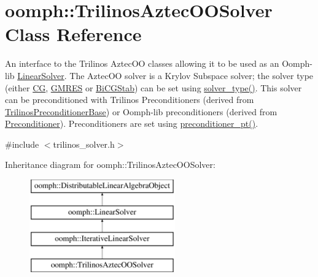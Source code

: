 \hypertarget{classoomph_1_1TrilinosAztecOOSolver}{}\section{oomph\+:\+:Trilinos\+Aztec\+O\+O\+Solver Class Reference}
\label{classoomph_1_1TrilinosAztecOOSolver}


An interface to the Trilinos Aztec\+OO classes allowing it to be used as an Oomph-\/lib \hyperlink{classoomph_1_1LinearSolver}{Linear\+Solver}. The Aztec\+OO solver is a Krylov Subspace solver; the solver type (either \hyperlink{classoomph_1_1CG}{CG}, \hyperlink{classoomph_1_1GMRES}{G\+M\+R\+ES} or \hyperlink{classoomph_1_1BiCGStab}{Bi\+C\+G\+Stab}) can be set using \hyperlink{classoomph_1_1TrilinosAztecOOSolver_a9169831da7460eec52071e8b3938bf97}{solver\+\_\+type()}. This solver can be preconditioned with Trilinos Preconditioners (derived from \hyperlink{classoomph_1_1TrilinosPreconditionerBase}{Trilinos\+Preconditioner\+Base}) or Oomph-\/lib preconditioners (derived from \hyperlink{classoomph_1_1Preconditioner}{Preconditioner}). Preconditioners are set using \hyperlink{classoomph_1_1IterativeLinearSolver_a800f699ec8dda290105807cb91297850}{preconditioner\+\_\+pt()}.  




{\ttfamily \#include $<$trilinos\+\_\+solver.\+h$>$}

Inheritance diagram for oomph\+:\+:Trilinos\+Aztec\+O\+O\+Solver\+:\begin{figure}[H]
\begin{center}
\leavevmode
\includegraphics[height=4.000000cm]{classoomph_1_1TrilinosAztecOOSolver}
\end{center}
\end{figure}
